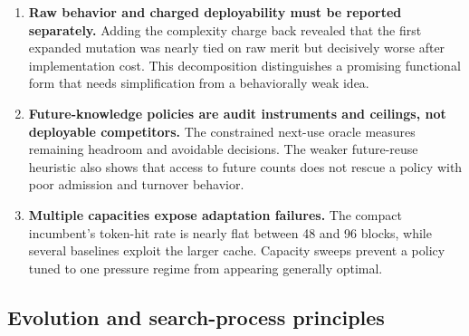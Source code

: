 \documentclass[11pt]{article}
\begin{document}
\begin{enumerate}
  \item \textbf{Raw behavior and charged deployability must be reported separately.}
  Adding the complexity charge back revealed that the first expanded mutation was
  nearly tied on raw merit but decisively worse after implementation cost.  This
  decomposition distinguishes a promising functional form that needs simplification
  from a behaviorally weak idea.

  \item \textbf{Future-knowledge policies are audit instruments and ceilings, not
  deployable competitors.}  The constrained next-use oracle measures remaining
  headroom and avoidable decisions.  The weaker future-reuse heuristic also shows that
  access to future counts does not rescue a policy with poor admission and turnover
  behavior.

  \item \textbf{Multiple capacities expose adaptation failures.}  The compact
  incumbent's token-hit rate is nearly flat between 48 and 96 blocks, while several
  baselines exploit the larger cache.  Capacity sweeps prevent a policy tuned to one
  pressure regime from appearing generally optimal.
\end{enumerate}

\subsection{Evolution and search-process principles}
\end{document}
